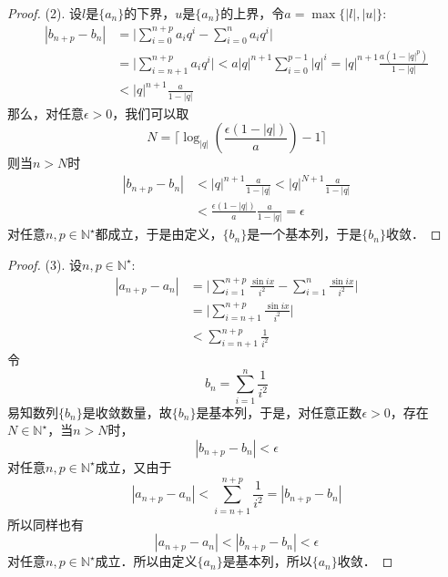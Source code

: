 \documentclass{ctexart}
\theoremstyle{definition}
\theoremstyle{definition}
\theoremstyle{plain}
\theoremstyle{plain}
\theoremstyle{plain}
\theoremstyle{definition}
\begin{document}
\begin{proof}
(2). 设$l$是$\{a_n\}$的下界，$u$是$\{a_n\}$的上界，令$a = \max\{ |l|, |u| \}$:
\begin{align}
    |b_{n+p} - b_n| &= \Bigg\lvert \sum_{i=0}^{n+p} a_i q^i - \sum_{i=0}^{n} a_i q^i \Bigg\rvert \\
    &= \Bigg\lvert \sum_{i=n+1}^{n+p} a_i q^i \Bigg\rvert < a |q|^{n+1} \sum_{i=0}^{p-1} |q|^i = |q|^{n+1} \frac{a(1-|q|^p)}{1-|q|} \\
    &< |q|^{n+1} \frac{a}{1-|q|}
\end{align}
那么，对任意$\epsilon > 0$，我们可以取
\begin{equation}
    N = \lceil \log_{|q|} \left(\frac{\epsilon(1-|q|)}{a}\right) - 1\rceil
\end{equation}
则当$n > N$时
\begin{align}
    |b_{n+p}-b_n| &< |q|^{n+1}\frac{a}{1-|q|} < |q|^{N+1} \frac{a}{1-|q|} \\
    &< \frac{\epsilon(1-|q|)}{a} \frac{a}{1-|q|} = \epsilon
\end{align}
对任意$n, p\in\mathbb{N}^\star$都成立，于是由定义，$\{b_n\}$是一个基本列，于是$\{b_n\}$收敛．
\end{proof}
\begin{proof}
(3). 设$n,p\in\mathbb{N}^\star$:
\begin{align}
    |a_{n+p}-a_n| &= \Bigg\lvert \sum_{i=1}^{n+p} \frac{\sin ix}{i^2} - \sum_{i=1}^n \frac{\sin ix}{i^2} \Bigg\rvert \\
    &= \Bigg\lvert \sum_{i=n+1}^{n+p} \frac{\sin ix}{i^2} \Bigg\rvert \\
    &< \sum_{i=n+1}^{n+p} \frac{1}{i^2}
\end{align}
令
\begin{equation}
    b_n = \sum_{i=1}^n \frac{1}{i^2}
\end{equation}
易知数列$\{b_n\}$是收敛数量，故$\{b_n\}$是基本列，于是，对任意正数$\epsilon > 0$，存在$N \in \mathbb{N}^\star$，当$n>N$时，
\begin{equation}
    |b_{n+p}-b_{n}|<\epsilon
\end{equation}
对任意$n,p\in\mathbb{N}^\star$成立，又由于
\begin{equation}
    |a_{n+p}-a_n|<\sum_{i=n+1}^{n+p} \frac{1}{i^2}= |b_{n+p}-b_n|
\end{equation}
所以同样也有
\begin{equation}
    |a_{n+p}-a_n|<|b_{n+p}-b_n|<\epsilon
\end{equation}
对任意$n,p\in\mathbb{N}^\star$成立．所以由定义$\{a_n\}$是基本列，所以$\{a_n\}$收敛．
\end{proof}
\end{document}
